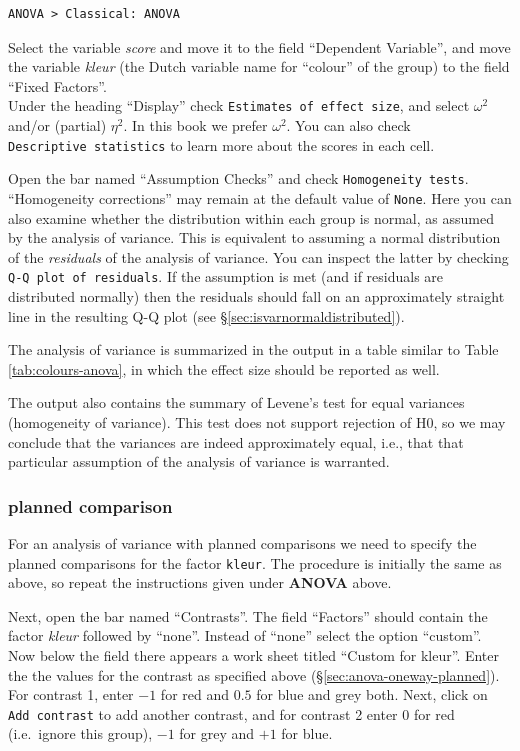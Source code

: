 \documentclass[
]{book}
\begin{document}
\begin{verbatim}
ANOVA > Classical: ANOVA
\end{verbatim}

Select the variable \emph{score} and move it to the field ``Dependent Variable'', and move the variable \emph{kleur} (the Dutch variable name for ``colour'' of the group) to the field ``Fixed Factors''.\\
Under the heading ``Display'' check \texttt{Estimates\ of\ effect\ size}, and select \(\omega^2\) and/or (partial) \(\eta^2\). In this book we prefer \(\omega^2\).
You can also check \texttt{Descriptive\ statistics} to learn more about the scores in each cell.

Open the bar named ``Assumption Checks'' and check \texttt{Homogeneity\ tests}.
``Homogeneity corrections'' may remain at the default value of \texttt{None}.
Here you can also examine whether the distribution within each group is normal, as assumed by the analysis of variance. This is equivalent to assuming a normal distribution of the \emph{residuals} of the analysis of variance. You can inspect the latter by checking \texttt{Q-Q\ plot\ of\ residuals}. If the assumption is met (and if residuals are distributed normally) then the residuals should fall on an approximately straight line in the resulting Q-Q plot (see §\ref{sec:isvarnormaldistributed}).

The analysis of variance is summarized in the output in a table similar to Table \ref{tab:colours-anova}, in which the effect size should be reported as well.

The output also contains the summary of Levene's test for equal variances (homogeneity of variance). This test does not support rejection of H0, so we may conclude that the variances are indeed approximately equal, i.e., that that particular assumption of the analysis of variance is warranted.

\hypertarget{planned-comparison-1}{%
\subsubsection{planned comparison}\label{planned-comparison-1}}

For an analysis of variance with planned comparisons we need to specify the planned comparisons for the factor \texttt{kleur}. The procedure is initially the same as above, so repeat the instructions given under \textbf{ANOVA} above.

Next, open the bar named ``Contrasts''. The field ``Factors'' should contain the factor \emph{kleur} followed by ``none''.
Instead of ``none'' select the option ``custom''. Now below the field there appears a work sheet titled ``Custom for kleur''. Enter the the values for the contrast as specified above (§\ref{sec:anova-oneway-planned}). For contrast 1, enter \(-1\) for red and \(0.5\) for blue and grey both. Next, click on \texttt{Add\ contrast} to add another contrast, and for contrast 2 enter \(0\) for red (i.e.~ignore this group), \(-1\) for grey and \(+1\) for blue.
\end{document}
